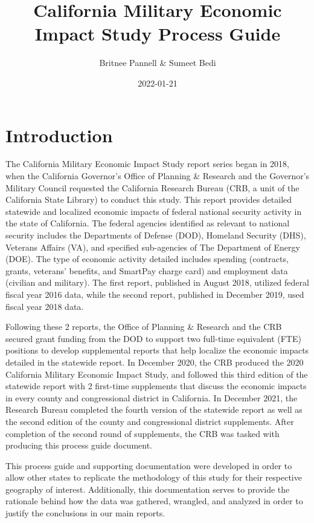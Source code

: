 \documentclass[
]{book}
\title{California Military Economic Impact Study Process Guide}
\author{Britnee Pannell \& Sumeet Bedi}
\date{2022-01-21}
\begin{document}
\maketitle

{
\setcounter{tocdepth}{1}
\tableofcontents
}
\hypertarget{introduction}{%
\chapter{Introduction}\label{introduction}}

The California Military Economic Impact Study report series began in 2018, when the California Governor's Office of Planning \& Research and the Governor's Military Council requested the California Research Bureau (CRB, a unit of the California State Library) to conduct this study. This report provides detailed statewide and localized economic impacts of federal national security activity in the state of California. The federal agencies identified as relevant to national security includes the Departments of Defense (DOD), Homeland Security (DHS), Veterans Affairs (VA), and specified sub-agencies of The Department of Energy (DOE). The type of economic activity detailed includes spending (contracts, grants, veterans' benefits, and SmartPay charge card) and employment data (civilian and military). The first report, published in August 2018, utilized federal fiscal year 2016 data, while the second report, published in December 2019, used fiscal year 2018 data.

Following these 2 reports, the Office of Planning \& Research and the CRB secured grant funding from the DOD to support two full-time equivalent (FTE) positions to develop supplemental reports that help localize the economic impacts detailed in the statewide report. In December 2020, the CRB produced the 2020 California Military Economic Impact Study, and followed this third edition of the statewide report with 2 first-time supplements that discuss the economic impacts in every county and congressional district in California. In December 2021, the Research Bureau completed the fourth version of the statewide report as well as the second edition of the county and congressional district supplements. After completion of the second round of supplements, the CRB was tasked with producing this process guide document.

This process guide and supporting documentation were developed in order to allow other states to replicate the methodology of this study for their respective geography of interest. Additionally, this documentation serves to provide the rationale behind how the data was gathered, wrangled, and analyzed in order to justify the conclusions in our main reports.
\end{document}
